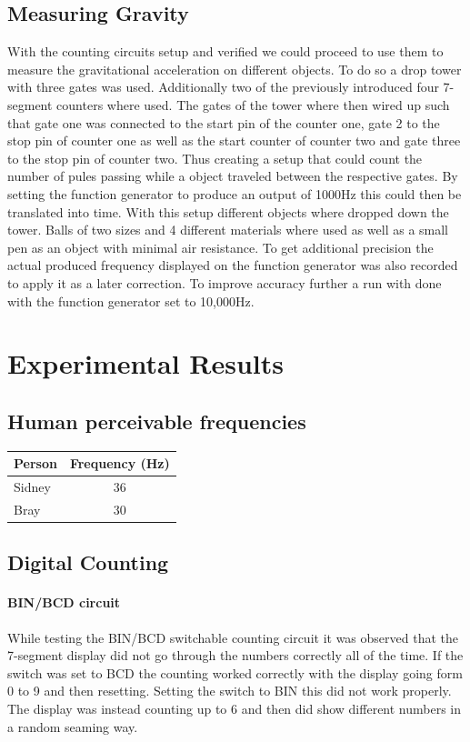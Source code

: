 \documentclass[fleqn,11pt]{article}
\begin{document}
\subsection{Measuring Gravity}
With the counting circuits setup and verified we could proceed to use them to measure the gravitational
acceleration on different objects. To do so a drop tower with three gates was used. Additionally two of the
previously introduced four 7-segment counters where used. The gates of the tower where then wired up such
that gate one was connected to the start pin of the counter one, gate 2 to the stop pin of counter one as
well as the start counter of counter two and gate three to the stop pin of counter two. Thus creating a
setup that could count the number of pules passing while a object traveled between the respective gates.
By setting the function generator to produce an output of 1000Hz this could then be translated into time.
With this setup different objects where dropped down the tower. Balls of two sizes and 4 different materials
where used as well as a small pen as an object with minimal air resistance. To get additional precision
the actual produced frequency displayed on the function generator was also recorded to apply it as a
later correction. To improve accuracy further a run with done with the function generator set to 10,000Hz.

\section{Experimental Results}

\subsection{Human perceivable frequencies}

\vspace{0.5cm}
\begin{tabular}{lc}
  Person & Frequency (Hz)\\
  \midrule
  Sidney & 36\\
  Bray & 30\\
\end{tabular}
\vspace{0.5cm}

\subsection{Digital Counting}
\paragraph{BIN/BCD circuit}
While testing the BIN/BCD switchable counting circuit it was observed that the 7-segment display did not
go through the numbers correctly all of the time. If the switch was set to BCD the counting worked correctly
with the display going form 0 to 9 and then resetting. Setting the switch to BIN this did not work properly.
The display was instead counting up to 6 and then did show different numbers in a random seaming way.
\end{document}
